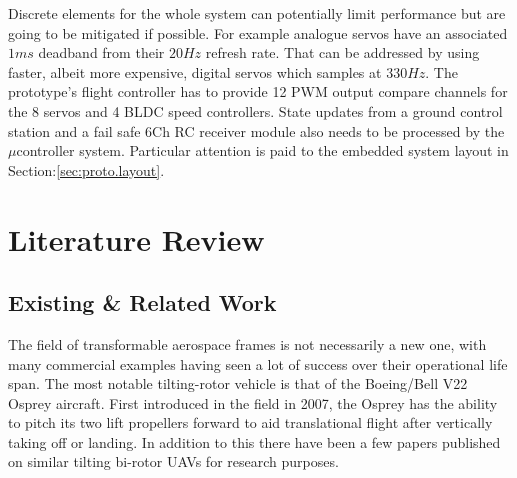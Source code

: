 Discrete elements for the whole system can potentially limit performance but are going to be mitigated if possible. For example analogue servos have an associated $1 ms$ deadband from their $20 Hz$ refresh rate. That can be addressed by using faster, albeit more expensive, digital servos which samples at $330 Hz$. The prototype's flight controller has to provide 12 PWM output compare channels for the 8 servos and 4 BLDC speed controllers. State updates from a ground control station and a fail safe 6Ch RC receiver module also needs to be processed by the $\mu$controller system. Particular attention is paid to the embedded system layout in Section:\ref{sec:proto.layout}.
\newpage
\section{Literature Review}
\label{sec:intro.litreview}
\subsection{Existing \& Related Work}
\label{subsec:intro.lit.related}
The field of transformable aerospace frames is not necessarily a new one, with many commercial examples having seen a lot of success over their operational life span. The most notable tilting-rotor vehicle is that of the Boeing/Bell V22 Osprey\cite{} aircraft. First introduced in the field in 2007, the Osprey has the ability to pitch its two lift propellers forward to aid translational flight after vertically taking off or landing. In addition to this there have been a few papers published on similar tilting bi-rotor UAVs for research purposes.
